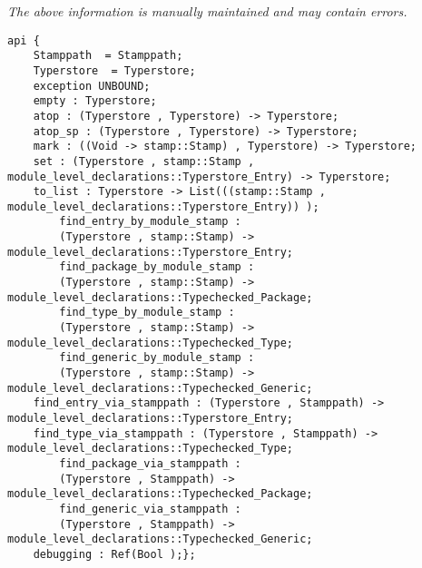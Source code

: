 \label{api:Typerstore}

{\tiny \it The above information is manually maintained and may contain errors.}
\begin{verbatim}
api {
    Stamppath  = Stamppath;
    Typerstore  = Typerstore;
    exception UNBOUND;
    empty : Typerstore;
    atop : (Typerstore , Typerstore) -> Typerstore;
    atop_sp : (Typerstore , Typerstore) -> Typerstore;
    mark : ((Void -> stamp::Stamp) , Typerstore) -> Typerstore;
    set : (Typerstore , stamp::Stamp , module_level_declarations::Typerstore_Entry) -> Typerstore;
    to_list : Typerstore -> List(((stamp::Stamp , module_level_declarations::Typerstore_Entry)) );
        find_entry_by_module_stamp :
        (Typerstore , stamp::Stamp) -> module_level_declarations::Typerstore_Entry;
        find_package_by_module_stamp :
        (Typerstore , stamp::Stamp) -> module_level_declarations::Typechecked_Package;
        find_type_by_module_stamp :
        (Typerstore , stamp::Stamp) -> module_level_declarations::Typechecked_Type;
        find_generic_by_module_stamp :
        (Typerstore , stamp::Stamp) -> module_level_declarations::Typechecked_Generic;
    find_entry_via_stamppath : (Typerstore , Stamppath) -> module_level_declarations::Typerstore_Entry;
    find_type_via_stamppath : (Typerstore , Stamppath) -> module_level_declarations::Typechecked_Type;
        find_package_via_stamppath :
        (Typerstore , Stamppath) -> module_level_declarations::Typechecked_Package;
        find_generic_via_stamppath :
        (Typerstore , Stamppath) -> module_level_declarations::Typechecked_Generic;
    debugging : Ref(Bool );};
\end{verbatim}
